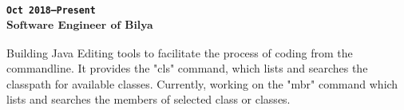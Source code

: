 \subsubsection{
\textsubscript{
\uppercase{\texttt{Oct 2018--Present}}\\
Software Engineer of Bilya
}
}
Building Java Editing tools to facilitate the process of coding from the commandline.
It provides the "cls" command, which lists and searches the classpath for available classes.
Currently, working on the "mbr" command which lists and searches the members of selected class or classes.
